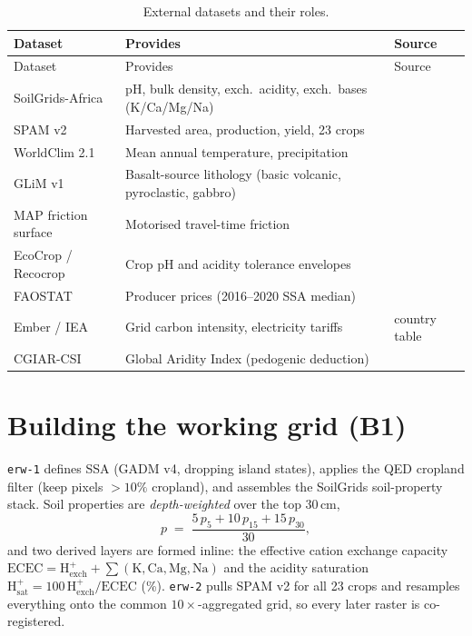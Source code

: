 \documentclass[openany]{book}
\begin{document}
\begin{longtable}[]{@{}lp{5.4cm}l@{}}
\caption{External datasets and their roles.}\label{tbl:data}\\
\toprule
Dataset & Provides & Source \\
\midrule
\endfirsthead
\toprule
Dataset & Provides & Source \\
\midrule
\endhead
SoilGrids-Africa & pH, bulk density, exch.\ acidity, exch.\ bases (K/Ca/Mg/Na) &
\citet{poggio2021} \\
SPAM v2 & Harvested area, production, yield, 23 crops & \citet{yu2020} \\
WorldClim 2.1 & Mean annual temperature, precipitation & \citet{fick2017} \\
GLiM v1 & Basalt-source lithology (basic volcanic, pyroclastic, gabbro) &
\citet{hartmann2012} \\
MAP friction surface & Motorised travel-time friction & \citet{weiss2020} \\
EcoCrop / Recocrop & Crop pH and acidity tolerance envelopes & \citet{recocrop} \\
FAOSTAT & Producer prices (2016--2020 SSA median) & \citet{faostat} \\
Ember / IEA & Grid carbon intensity, electricity tariffs & country table \\
CGIAR-CSI & Global Aridity Index (pedogenic deduction) & \citet{zomer2022} \\
\bottomrule
\end{longtable}

\section{Building the working grid (B1)}

\texttt{erw-1} defines SSA (GADM v4, dropping island states), applies the QED
cropland filter (keep pixels $>10\%$ cropland), and assembles the SoilGrids
soil-property stack. Soil properties are \emph{depth-weighted} over the top
30\,cm,
%
\begin{equation}
p \;=\; \frac{5\,p_{5} + 10\,p_{15} + 15\,p_{30}}{30},
\label{eq:depthweight}
\end{equation}
%
and two derived layers are formed inline: the effective cation exchange capacity
$\mathrm{ECEC} = \mathrm{H^{+}_{exch}} + \sum(\mathrm{K,Ca,Mg,Na})$ and the
acidity saturation $\mathrm{H^{+}_{sat}} = 100\,\mathrm{H^{+}_{exch}}/\mathrm{ECEC}$
(\%). \texttt{erw-2} pulls SPAM v2 for all 23 crops and resamples everything onto
the common $10\times$-aggregated grid, so every later raster is co-registered.
\end{document}
